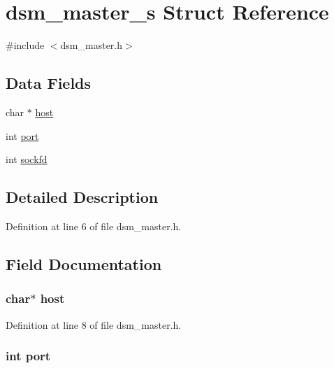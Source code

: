 \hypertarget{structdsm__master__s}{}\section{dsm\+\_\+master\+\_\+s Struct Reference}
\label{structdsm__master__s}


{\ttfamily \#include $<$dsm\+\_\+master.\+h$>$}

\subsection*{Data Fields}
\begin{DoxyCompactItemize}
\item 
char $\ast$ \hyperlink{structdsm__master__s_a1c2046dcb30a629d6d9f45ff8f403f12}{host}
\item 
int \hyperlink{structdsm__master__s_a63c89c04d1feae07ca35558055155ffb}{port}
\item 
int \hyperlink{structdsm__master__s_ad2c8fb3df3a737e0685e902870a611d2}{sockfd}
\end{DoxyCompactItemize}


\subsection{Detailed Description}


Definition at line 6 of file dsm\+\_\+master.\+h.



\subsection{Field Documentation}
\subsubsection[{\texorpdfstring{host}{host}}]{\setlength{\rightskip}{0pt plus 5cm}char$\ast$ host}\hypertarget{structdsm__master__s_a1c2046dcb30a629d6d9f45ff8f403f12}{}\label{structdsm__master__s_a1c2046dcb30a629d6d9f45ff8f403f12}


Definition at line 8 of file dsm\+\_\+master.\+h.

\subsubsection[{\texorpdfstring{port}{port}}]{\setlength{\rightskip}{0pt plus 5cm}int port}\hypertarget{structdsm__master__s_a63c89c04d1feae07ca35558055155ffb}{}\label{structdsm__master__s_a63c89c04d1feae07ca35558055155ffb}


